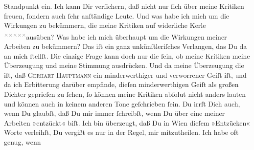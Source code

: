\begin{ledgroupsized}[t]{13cm}
{{{{                  Standpunkt}}}}\label{K_L03091-3h} ein. Ich kann Dir verſichern, daß
                  {\pb}nicht nur \label{K_L03091-2v}\label{K_L03091-2h} ſich über meine Kritiken freuen, ſondern auch ſehr anſtändige Leute. Und was
               habe ich mich um die Wirkungen zu bekümmern, die meine Kritiken { } auf widerliche Kerle \substVorne{}\textsuperscript{\textcolor{gray}{×}\-\textcolor{gray}{×}\-\textcolor{gray}{×}\-\textcolor{gray}{×}\-\textcolor{gray}{×}}\substDazwischen{}ausüben\substHinten{}? Was habe ich mich überhaupt um die Wirkungen meiner Arbeiten zu bekümmern?
               Das iſt \strikeout{\textcolor{gray}{doch}} ein ganz unkünſtleriſches Verlangen, das Du da an mich ſtellſt. Die einzige
               Frage kann doch nur die ſein, ob meine Kritiken meine Überzeugung und meine Stimmung
               ausdrücken. Und da meine Überzeugung die iſt, daß \textsc{Gerhart Hauptmann} ein minderwerthiger {\pb}und verworrener Geiſt
               iſt, und da ich Erbitterung darüber empfinde, dieſen minderwerthigen Geiſt als großen Dichter
               geprieſen zu ſehen, ſo \strikeout{\textcolor{gray}{ſ}} können meine Kritiken abſolut nicht anders lauten und können auch in keinem
               anderen Tone geſchrieben ſein.\pend
           \pstart
           Du irrſt Dich auch, wenn Du glaubſt, daß Du mir immer ſchreibſt, wenn Du über eine
               meiner Arbeiten »entzückt« biſt. Ich bin überzeugt, daß Du in Wien dieſem »Entzücken« Worte verleihſt, Du vergißt es nur in
               der {\pb}Regel, mir mitzutheilen. Ich habe oft genug, wenn

\end{ledgroupsized}
